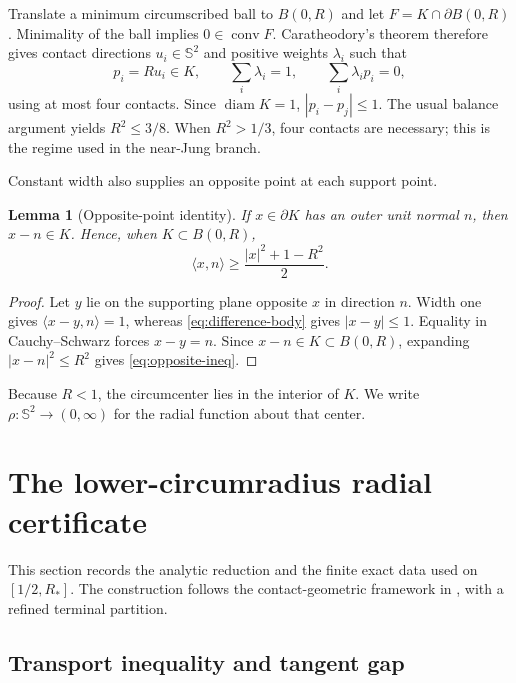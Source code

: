 \documentclass[11pt,reqno]{amsart}
\newtheorem{lemma}[theorem]{Lemma}
\theoremstyle{remark}
\newcommand{\Sph}{\mathbb S^2}
\newcommand{\conv}{\operatorname{conv}}
\newcommand{\diam}{\operatorname{diam}}
\begin{document}
Translate a minimum circumscribed ball to $B(0,R)$ and let
$F=K\cap\partial B(0,R)$.  Minimality of the ball implies
$0\in\conv F$.  Caratheodory's theorem therefore gives contact directions
$u_i\in\Sph$ and positive weights $\lambda_i$ such that
\begin{equation}\label{eq:contact-balance}
 p_i=Ru_i\in K,\qquad
 \sum_i\lambda_i=1,\qquad
 \sum_i\lambda_i p_i=0,
\end{equation}
using at most four contacts.  Since $\diam K=1$,
$|p_i-p_j|\le1$.  The usual balance argument yields $R^2\le3/8$.  When
$R^2>1/3$, four contacts are necessary; this is the regime used in the
near-Jung branch.

Constant width also supplies an opposite point at each support point.

\begin{lemma}[Opposite-point identity]\label{lem:opposite}
If $x\in\partial K$ has an outer unit normal $n$, then $x-n\in K$.  Hence,
when $K\subset B(0,R)$,
\begin{equation}\label{eq:opposite-ineq}
 \langle x,n\rangle\ge \frac{|x|^2+1-R^2}{2}.
\end{equation}
\end{lemma}

\begin{proof}
Let $y$ lie on the supporting plane opposite $x$ in direction $n$.  Width one
gives $\langle x-y,n\rangle=1$, whereas \eqref{eq:difference-body} gives
$|x-y|\le1$.  Equality in Cauchy--Schwarz forces $x-y=n$.  Since
$x-n\in K\subset B(0,R)$, expanding $|x-n|^2\le R^2$ gives
\eqref{eq:opposite-ineq}.
\end{proof}

Because $R<1$, the circumcenter lies in the interior of $K$.  We write
$\rho:\Sph\to(0,\infty)$ for the radial function about that center.

\section{The lower-circumradius radial certificate}
\label{sec:lower}

This section records the analytic reduction and the finite exact data used on
$[1/2,R_*]$.  The construction follows the contact-geometric framework in
\cite{HYRA2026}, with a refined terminal partition.

\subsection{Transport inequality and tangent gap}
\end{document}
